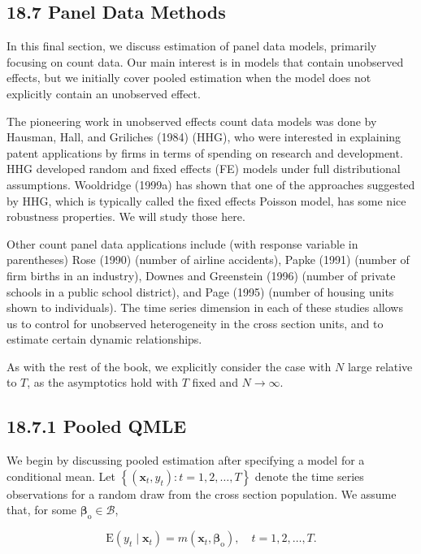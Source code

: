 \documentclass[10pt]{article}
\begin{document}
\subsection*{18.7 Panel Data Methods}
In this final section, we discuss estimation of panel data models, primarily focusing on count data. Our main interest is in models that contain unobserved effects, but we initially cover pooled estimation when the model does not explicitly contain an unobserved effect.

The pioneering work in unobserved effects count data models was done by Hausman, Hall, and Griliches (1984) (HHG), who were interested in explaining patent applications by firms in terms of spending on research and development. HHG developed random and fixed effects (FE) models under full distributional assumptions. Wooldridge (1999a) has shown that one of the approaches suggested by HHG, which is typically called the fixed effects Poisson model, has some nice robustness properties. We will study those here.

Other count panel data applications include (with response variable in parentheses) Rose (1990) (number of airline accidents), Papke (1991) (number of firm births in an industry), Downes and Greenstein (1996) (number of private schools in a public school district), and Page (1995) (number of housing units shown to individuals). The time series dimension in each of these studies allows us to control for unobserved heterogeneity in the cross section units, and to estimate certain dynamic relationships.

As with the rest of the book, we explicitly consider the case with $N$ large relative to $T$, as the asymptotics hold with $T$ fixed and $N \rightarrow \infty$.

\subsection*{18.7.1 Pooled QMLE}
We begin by discussing pooled estimation after specifying a model for a conditional mean. Let $\left\{\left(\mathbf{x}_{t}, y_{t}\right): t=1,2, \ldots, T\right\}$ denote the time series observations for a random draw from the cross section population. We assume that, for some $\boldsymbol{\beta}_{\mathrm{o}} \in \mathscr{B}$,


\begin{equation*}
\mathrm{E}\left(y_{t} \mid \mathbf{x}_{t}\right)=m\left(\mathbf{x}_{t}, \boldsymbol{\beta}_{\mathrm{o}}\right), \quad t=1,2, \ldots, T . \tag{18.68}
\end{equation*}
\end{document}
